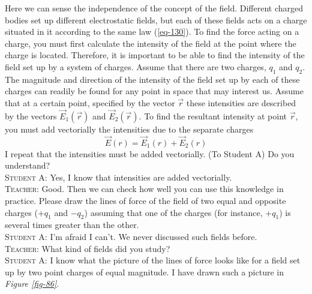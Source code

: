 \documentclass[a4paper,sfsidenotes]{tufte-book}
\begin{document}
Here we can sense the independence of the concept of the field. Different charged bodies set up different electrostatic fields, but each of these fields acts on a charge situated in it according to the same law (\ref{eq-130}). To find the force acting on a charge, you must first calculate the intensity of the field at the point where the charge is located. Therefore, it is important to be able to find the intensity of the field set up by a system of charges. Assume that there are two charges, $q_{1}$ and $q_{2}$. The magnitude and direction of the intensity of the field set up by each of these charges can readily be found for any point in space that may interest us. Assume that at a certain point, specified by the vector $\vec{r}$ these intensities are described by the vectors $\vec{E}_{1}(\vec{r})$ and $\vec{E}_{2}(\vec{r})$. To find the resultant intensity at point $\vec{r}$, you must add vectorially the intensities due to the separate charges
\begin{equation}
\vec{E}(r) = \vec{E}_{1}(r) + \vec{E}_{2}(r)
\label{eq-131}
\end{equation}
I repeat that the intensities must be added vectorially. (To Student A) Do you understand?
\\
\textsc{Student A:} Yes, I know that intensities are added vectorially.
\\
\textsc{Teacher:} Good. Then we can check how well you can use this knowledge in practice. Please draw the lines of force of the field of two equal and opposite charges ($+q_{1}$ and  $-q_{2}$) assuming that one of the charges (for instance, $+q_{1}$) is several times greater than the other.
\\
\textsc{Student A:} I'm afraid I can't. We never discussed such fields before.
\\
\textsc{Teacher:} What kind of fields did you study?
\\
\textsc{Student A:} I know what the picture of the lines of force looks like for a field set up by two point charges of equal magnitude. I have drawn such a picture in \emph{Figure \ref{fig-86}}.
\end{document}
